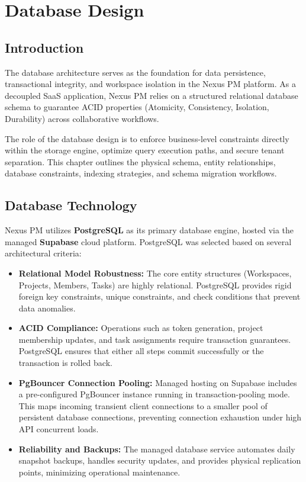 \chapter{Database Design}
\label{chap:database-design}

\section{Introduction}
The database architecture serves as the foundation for data persistence, transactional integrity, and workspace isolation in the Nexus PM platform. As a decoupled SaaS application, Nexus PM relies on a structured relational database schema to guarantee ACID properties (Atomicity, Consistency, Isolation, Durability) across collaborative workflows. 

The role of the database design is to enforce business-level constraints directly within the storage engine, optimize query execution paths, and secure tenant separation. This chapter outlines the physical schema, entity relationships, database constraints, indexing strategies, and schema migration workflows.

\section{Database Technology}
Nexus PM utilizes \textbf{PostgreSQL} as its primary database engine, hosted via the managed \textbf{Supabase} cloud platform. PostgreSQL was selected based on several architectural criteria:
\begin{itemize}
    \item \textbf{Relational Model Robustness:} The core entity structures (Workspaces, Projects, Members, Tasks) are highly relational. PostgreSQL provides rigid foreign key constraints, unique constraints, and check conditions that prevent data anomalies.
    \item \textbf{ACID Compliance:} Operations such as token generation, project membership updates, and task assignments require transaction guarantees. PostgreSQL ensures that either all steps commit successfully or the transaction is rolled back.
    \item \textbf{PgBouncer Connection Pooling:} Managed hosting on Supabase includes a pre-configured PgBouncer instance running in transaction-pooling mode. This maps incoming transient client connections to a smaller pool of persistent database connections, preventing connection exhaustion under high API concurrent loads.
    \item \textbf{Reliability and Backups:} The managed database service automates daily snapshot backups, handles security updates, and provides physical replication points, minimizing operational maintenance.
\end{itemize}

